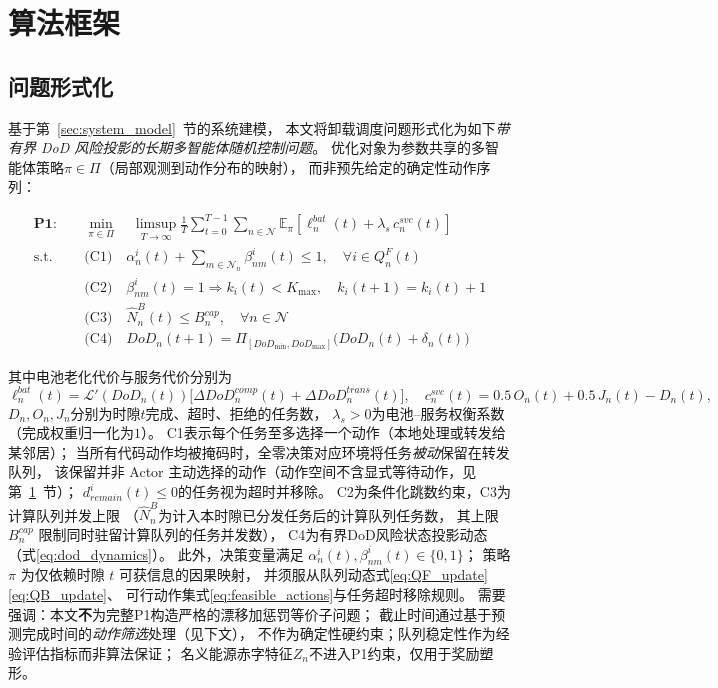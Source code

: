 \documentclass[a4paper,11pt]{article}
\begin{document}
\section{算法框架}
\label{sec:algorithm}

\subsection{问题形式化}

基于第~\ref{sec:system_model}~节的系统建模，
本文将卸载调度问题形式化为如下\emph{带有界 DoD 风险投影的长期多智能体随机控制问题}。
优化对象为参数共享的多智能体策略$\pi\in\Pi$（局部观测到动作分布的映射），
而非预先给定的确定性动作序列：

\begin{equation}
\begin{aligned}
\mathbf{P1:} \quad &\min_{\pi \in \Pi} \quad
\limsup_{T \to \infty} \frac{1}{T} \sum_{t=0}^{T-1}
\sum_{n \in \mathcal{N}} \mathbb{E}_\pi\!\left[
\ell^{bat}_n(t) + \lambda_s\, c^{svc}_n(t)
\right] \\
\text{s.t.} \quad
&\text{(C1)} \quad \alpha^i_n(t) + \sum_{m \in \mathcal{N}_n}
\beta^i_{nm}(t) \leq 1,
\quad \forall i \in Q^F_n(t) \\
&\text{(C2)} \quad \beta^i_{nm}(t)=1 \Rightarrow k_i(t) < K_{\max},
\quad k_i(t\!+\!1)=k_i(t)+1 \\
&\text{(C3)} \quad \hat{N}^B_n(t) \leq B^{cap}_n,
\quad \forall n \in \mathcal{N} \\
&\text{(C4)} \quad DoD_n(t\!+\!1) =
\Pi_{[DoD_{\min},DoD_{\max}]}\!\big(DoD_n(t)+\delta_n(t)\big)
\end{aligned}
\label{eq:P1}
\end{equation}

其中电池老化代价与服务代价分别为
\begin{equation}
\ell^{bat}_n(t) = \mathcal{L}'(DoD_n(t))\big[
\Delta DoD^{comp}_n(t)+\Delta DoD^{trans}_n(t)\big],
\quad
c^{svc}_n(t) = 0.5\,O_n(t)+0.5\,J_n(t)-D_n(t),
\label{eq:p1_terms}
\end{equation}
$D_n,O_n,J_n$分别为时隙$t$完成、超时、拒绝的任务数，
$\lambda_s>0$为电池--服务权衡系数（完成权重归一化为$1$）。
C1表示每个任务至多选择一个动作（本地处理或转发给某邻居）；
当所有代码动作均被掩码时，全零决策对应环境将任务\emph{被动}保留在转发队列，
该保留并非 Actor 主动选择的动作（动作空间不含显式等待动作，见第~\ref{sec:algorithm}~节）；
$d^i_{remain}(t)\le 0$的任务视为超时并移除。
C2为条件化跳数约束，C3为计算队列并发上限
（$\hat{N}^B_n$为计入本时隙已分发任务后的计算队列任务数，
其上限 $B^{cap}_n$ 限制同时驻留计算队列的任务并发数），
C4为有界DoD风险状态投影动态（式\eqref{eq:dod_dynamics}）。
此外，决策变量满足 $\alpha^i_n(t),\beta^i_{nm}(t)\in\{0,1\}$；
策略 $\pi$ 为仅依赖时隙 $t$ 可获信息的因果映射，
并须服从队列动态式\eqref{eq:QF_update}\eqref{eq:QB_update}、
可行动作集式\eqref{eq:feasible_actions}与任务超时移除规则。
需要强调：本文\textbf{不}为完整P1构造严格的漂移加惩罚等价子问题；
截止时间通过基于预测完成时间的\emph{动作筛选}处理（见下文），
不作为确定性硬约束；队列稳定性作为经验评估指标而非算法保证；
名义能源赤字特征$Z_n$不进入P1约束，仅用于奖励塑形。
\end{document}
